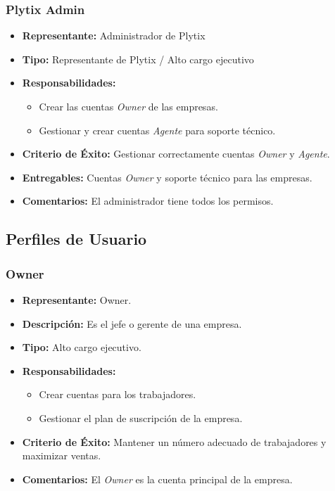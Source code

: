\documentclass[12pt.a4paper]{article}
\begin{document}
\subsubsection{Plytix Admin}

\begin{itemize}
    \item \textbf{Representante:} Administrador de Plytix
    \item \textbf{Tipo:} Representante de Plytix / Alto cargo ejecutivo
    \item \textbf{Responsabilidades:}
    \begin{itemize}
        \item Crear las cuentas \textit{Owner} de las empresas.
        \item Gestionar y crear cuentas \textit{Agente} para soporte técnico.
    \end{itemize}
    \item \textbf{Criterio de Éxito:} Gestionar correctamente cuentas \textit{Owner} y \textit{Agente}.
    \item \textbf{Entregables:} Cuentas \textit{Owner} y soporte técnico para las empresas.
    \item \textbf{Comentarios:} El administrador tiene todos los permisos.
\end{itemize}

\subsection{Perfiles de Usuario}

\subsubsection{Owner}

\begin{itemize}
    \item \textbf{Representante:} Owner.
    \item \textbf{Descripción:} Es el jefe o gerente de una empresa.
    \item \textbf{Tipo:} Alto cargo ejecutivo.
    \item \textbf{Responsabilidades:}
    \begin{itemize}
        \item Crear cuentas para los trabajadores.
        \item Gestionar el plan de suscripción de la empresa.
    \end{itemize}
    \item \textbf{Criterio de Éxito:} Mantener un número adecuado de trabajadores y maximizar ventas.
    \item \textbf{Comentarios:} El \textit{Owner} es la cuenta principal de la empresa.
\end{itemize}
\end{document}
